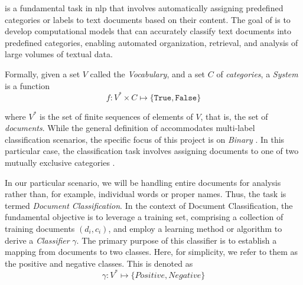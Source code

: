 \label{02_text_classification}

\textclassification{} is a fundamental task in \gls{nlp} that involves automatically assigning predefined categories or labels to text documents based on their content. The goal of \textclassification{} is to develop computational models that can accurately classify text documents into predefined categories, enabling automated organization, retrieval, and analysis of large volumes of textual data.

Formally, given a set $V$ called the \emph{Vocabulary}, and a set $C$ of \emph{categories}, a \emph{\textclassification{} System} is a function 
$$f: V^*\times C \mapsto \{ \texttt{True}, \texttt{False} \}$$

where $V^*$ is the set of finite sequences of elements of $V$, that is, the set of \emph{documents}. 
While the general definition of \textclassification{} accommodates multi-label classification scenarios, the specific focus of this project is on \emph{Binary \textclassification{}}. In this particular case, the classification task involves assigning documents to one of two mutually exclusive categories 
.

In our particular scenario, we will be handling entire documents for analysis rather than, for example, individual words or proper names. Thus, the task is termed \emph{Document Classification}.
In the context of Document Classification, the fundamental objective is to leverage a training set, comprising a collection of training documents $(d_i, c_i)$, and employ a learning method or algorithm to derive a \emph{Classifier} $\gamma$. The primary purpose of this classifier is to establish a mapping from documents to two classes. Here, for simplicity, we  refer to them as the positive and negative classes.  This is denoted as 
$$\gamma : V^* \mapsto \{Positive, Negative\}$$
